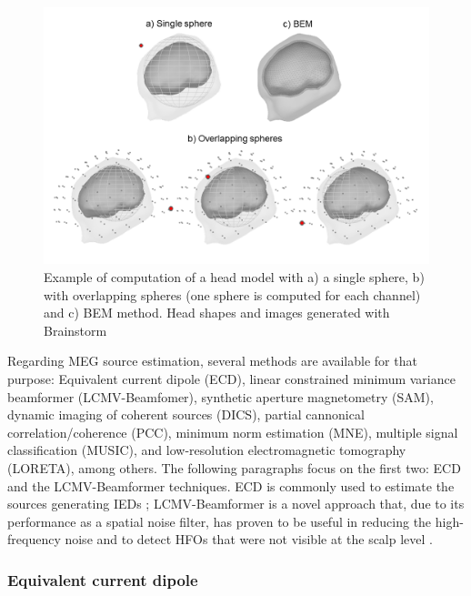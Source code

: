 \begin{figure}[ht]
\centering
\includegraphics[width=1\textwidth]{Images/bemspheres.png}
\caption{Example of computation of a head model with a) a single sphere, b) with overlapping spheres (one sphere is computed for each channel) and c) BEM method. Head shapes and images generated with Brainstorm \citep{Tadel2011}}
\label{fig:headmodels}
\end{figure}      

Regarding MEG source estimation, several methods are available for that purpose: Equivalent current dipole (ECD), linear constrained minimum variance beamformer (LCMV-Beamfomer), synthetic aperture magnetometry (SAM), dynamic imaging of coherent sources (DICS), partial cannonical correlation/coherence (PCC), minimum norm estimation (MNE),  multiple signal classification (MUSIC), and low-resolution electromagnetic tomography (LORETA), among others. The following paragraphs focus on the first two: ECD and the LCMV-Beamformer techniques. ECD is commonly used to estimate the sources generating IEDs \citep{Stefan2003,Fischer2005,Oishi2006}; LCMV-Beamformer is a novel approach that, due to its performance as a spatial noise filter, has proven to be useful in reducing the high-frequency noise and to detect HFOs that were not visible at the scalp level \citep{vanKlink2015,Nissen2016}.  

\subsubsection{Equivalent current dipole}

